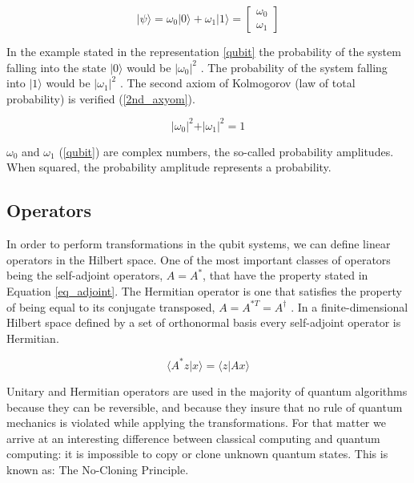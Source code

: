 \begin{equation}
\label{qubit}
\vert \psi \rangle = \omega_{0}\vert0\rangle+\omega_{1}\vert1\rangle = \left[\begin{array}{c}
\omega_{0}\\
\omega_{1}
\end{array}\right]
\end{equation}

In the example stated in the representation \ref{qubit} the probability of the system falling into the state $\vert 0 \rangle $ would be $\vert\omega_{0}\vert^{2}$ . The probability of the system falling into $\vert 1 \rangle $ would be $\vert\omega_{1}\vert^{2}$ . The second axiom of Kolmogorov (law of total probability) is verified (\ref{2nd_axyom}).

\begin{equation}
\label{2nd_axyom}
\vert\omega_{0}\vert^{2}+\vert\omega_{1}\vert^{2}=1
\end{equation}

 
$\omega_{0}$ and $\omega_{1}$ (\ref{qubit}) are complex numbers, the so-called probability amplitudes. When squared, the probability amplitude represents a probability. 

\subsection{Operators}
\label{subsec:QCoperators}

In order to perform transformations in the qubit systems, we can define linear operators in the Hilbert space. One of the most important classes of operators being the self-adjoint operators,  $A = A^{*}$, that have the property stated in Equation \ref{eq_adjoint}. The Hermitian operator is one that satisfies the property of being equal to its conjugate transposed, $A = A^{*T} =A^\dagger$ .  In a finite-dimensional Hilbert space defined by a set of orthonormal basis every self-adjoint operator is Hermitian. 

\begin{equation}
\label{eq_adjoint}
\langle A^{*}z\vert x\rangle=\langle z\vert Ax\rangle
\end{equation}

Unitary and Hermitian operators are used in the majority of quantum algorithms because they can be reversible, and because they insure that no rule of quantum mechanics is violated while applying the transformations. For that matter we arrive at an interesting difference between classical computing and quantum computing: it is impossible to copy or clone unknown quantum states\cite{Rieffel2011}. This is known as: The No-Cloning Principle.

